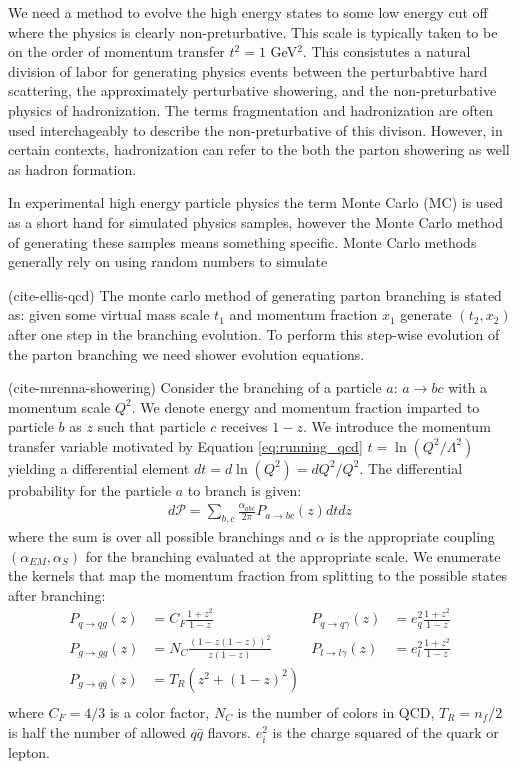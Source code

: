 We need a method to evolve the high energy states to some low energy cut off where the physics is clearly non-preturbative. 
This scale is typically taken to be on the order of momentum transfer $t^2 = 1$ GeV$^2$.
This consistutes a natural division of labor for generating physics events between the perturbabtive hard scattering, the approximately perturbative showering, and the non-preturbative physics of hadronization. The terms fragmentation and hadronization are often used interchageably to describe the non-preturbative of this divison. However, in certain contexts, hadronization can refer to the both the parton showering as well as hadron formation. 

In experimental high energy particle physics the term Monte Carlo (MC) is used as a short hand for simulated 
physics samples, however the Monte Carlo method of generating
these samples means something specific. Monte Carlo methods generally rely on using random numbers to simulate 

 
(cite-ellis-qcd) The monte carlo method of generating parton branching is stated as: given some 
virtual mass scale $t_1$ and momentum fraction $x_1$ generate
 $(t_2, x_2)$ after one step in the branching evolution. To perform this step-wise evolution of the parton 
branching we need shower evolution equations.

(cite-mrenna-showering) Consider the branching of a particle $a$:  $a\rightarrow bc$ with a 
momentum scale $Q^2$. We denote energy and momentum fraction imparted to particle $b$ as $z$
 such that particle $c$ receives $1-z$. We introduce the momentum
transfer variable motivated by Equation \ref{eq:running_qcd} $t = \ln (Q^2 / \Lambda^2)$ yielding 
a differential element $dt = d\ln (Q^2) = dQ^2/Q^2$. The
differential probability for the particle $a$ to branch is given:
\begin{align*}
d\mathcal{P} = \sum_{b,c} \frac{\alpha_{abc}}{2\pi} P_{a \rightarrow bc}(z) dt dz 
\end{align*}
where the sum is over all possible branchings and $\alpha$ is the appropriate 
coupling $(\alpha_{EM},\alpha_{S})$  for the branching evaluated at the appropriate scale. We enumerate the kernels that map the momentum fraction from splitting
 to the possible states after branching:
\begin{align*}
P_{q\rightarrow qg} (z) &= C_F\frac{1+z^2}{1-z}   &P_{q\rightarrow q\gamma} (z) &= e_q^2\frac{1+z^2}{1-z}\\
P_{g\rightarrow gg} (z) &= N_C\frac{(1-z(1-z))^2}{z(1-z)} &P_{l\rightarrow l\gamma} (z) &= e_l^2\frac{1+z^2}{1-z} \\ 
P_{g\rightarrow q\bar{q}} (z) &= T_R (z^2 + (1-z)^2)\\
\end{align*}
where $C_F=4/3$ is a color factor, $N_C$ is the number of colors in QCD, $T_R = n_f / 2$ is half the number 
of allowed $q\bar{q}$ flavors. $e_i^2$ is the charge squared of the quark or lepton. 

